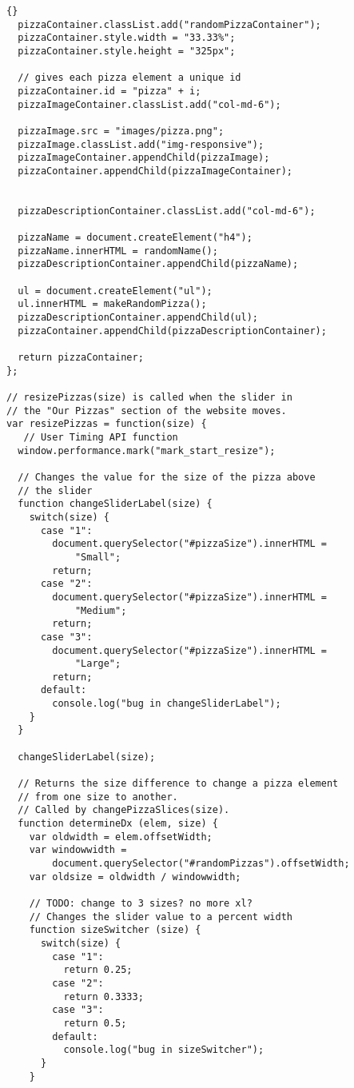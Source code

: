 \documentclass[twoside]{article}
\begin{document}
\begin{lstlisting}{}
  pizzaContainer.classList.add("randomPizzaContainer");
  pizzaContainer.style.width = "33.33%";
  pizzaContainer.style.height = "325px";

  // gives each pizza element a unique id
  pizzaContainer.id = "pizza" + i;
  pizzaImageContainer.classList.add("col-md-6");

  pizzaImage.src = "images/pizza.png";
  pizzaImage.classList.add("img-responsive");
  pizzaImageContainer.appendChild(pizzaImage);
  pizzaContainer.appendChild(pizzaImageContainer);


  pizzaDescriptionContainer.classList.add("col-md-6");

  pizzaName = document.createElement("h4");
  pizzaName.innerHTML = randomName();
  pizzaDescriptionContainer.appendChild(pizzaName);

  ul = document.createElement("ul");
  ul.innerHTML = makeRandomPizza();
  pizzaDescriptionContainer.appendChild(ul);
  pizzaContainer.appendChild(pizzaDescriptionContainer);

  return pizzaContainer;
};

// resizePizzas(size) is called when the slider in 
// the "Our Pizzas" section of the website moves.
var resizePizzas = function(size) { 
   // User Timing API function
  window.performance.mark("mark_start_resize");

  // Changes the value for the size of the pizza above 
  // the slider
  function changeSliderLabel(size) {
    switch(size) {
      case "1":
        document.querySelector("#pizzaSize").innerHTML =
            "Small";
        return;
      case "2":
        document.querySelector("#pizzaSize").innerHTML =
            "Medium";
        return;
      case "3":
        document.querySelector("#pizzaSize").innerHTML =
            "Large";
        return;
      default:
        console.log("bug in changeSliderLabel");
    }
  }

  changeSliderLabel(size);

  // Returns the size difference to change a pizza element
  // from one size to another. 
  // Called by changePizzaSlices(size).
  function determineDx (elem, size) {
    var oldwidth = elem.offsetWidth;
    var windowwidth = 
        document.querySelector("#randomPizzas").offsetWidth;
    var oldsize = oldwidth / windowwidth;

    // TODO: change to 3 sizes? no more xl?
    // Changes the slider value to a percent width
    function sizeSwitcher (size) {
      switch(size) {
        case "1":
          return 0.25;
        case "2":
          return 0.3333;
        case "3":
          return 0.5;
        default:
          console.log("bug in sizeSwitcher");
      }
    }


\end{lstlisting}
\end{document}
